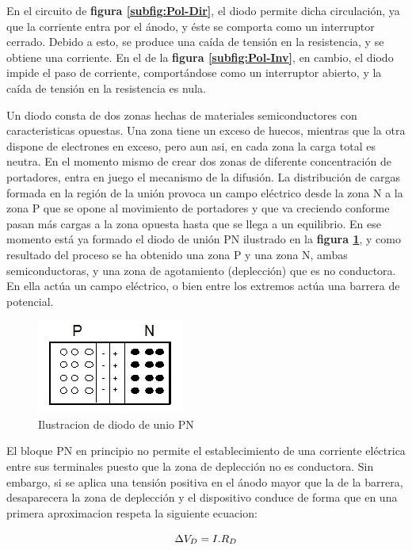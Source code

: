 \documentclass[11pt,a4paper]{article}
\begin{document}
En el circuito de \textbf{figura \ref{subfig:Pol-Dir}}, el diodo permite dicha circulación, ya que la corriente entra por el ánodo, y éste se comporta como un interruptor cerrado. Debido a esto, se produce una caída de tensión en la resistencia, y se obtiene una corriente. En el de la \textbf{figura \ref{subfig:Pol-Inv}}, en cambio, el diodo impide el paso de corriente, comportándose como un interruptor abierto, y la caída de tensión en la resistencia es nula.

Un diodo consta de dos zonas hechas de materiales semiconductores con caracteristicas opuestas. Una zona tiene un exceso de huecos, mientras que la otra dispone de electrones en exceso, pero aun asi, en cada zona la carga total es neutra. En el momento mismo de crear dos zonas de diferente concentración de portadores, entra en juego el mecanismo de la difusión. La distribución de cargas formada en la región de la unión provoca un campo eléctrico desde la zona N a la zona P que se opone al movimiento de portadores y que va creciendo conforme pasan más cargas a la zona opuesta hasta que se llega a un equilibrio. En ese momento está ya formado el diodo de unión PN ilustrado en la \textbf{figura \ref{fig:Dif}}, y como resultado del proceso se ha obtenido una zona P y una zona N, ambas semiconductoras, y una zona de agotamiento (deplección) que es no conductora. En ella actúa un campo eléctrico, o bien entre los extremos actúa una barrera de potencial.

\begin{figure}[h]
\centering
\includegraphics[scale=0.8]{Difusion}
   \caption{Ilustracion de diodo de unio PN}
   \label{fig:Dif}
\end{figure}

El bloque PN  en principio no permite el establecimiento de una corriente eléctrica entre sus terminales puesto que la zona de deplección no es conductora. Sin embargo, si se aplica una tensión positiva en el ánodo mayor que la de la barrera, desaparecera la zona de deplección y el dispositivo conduce de forma que en una primera aproximacion respeta la siguiente ecuacion:

\begin{equation}{\label{Aprox}}
\Delta  V_D = I.R_D\\
\end{equation}
\end{document}
